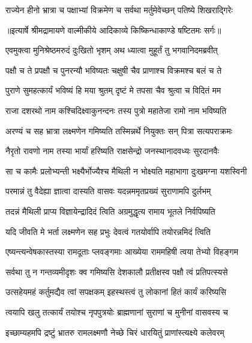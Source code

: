 \twolineshloka
{राज्येन हीनो भ्रात्रा च पक्षाभ्यां विक्रमेण च}
{सर्वथा मर्तुमेवेच्छन् पतिष्ये शिखराद्गिरेः} %


{॥इत्यार्षे श्रीमद्रामायणे वाल्मीकीये आदिकाव्ये किष्किन्धाकाण्डे षष्टितमः सर्गः॥}


\twolineshloka
{एवमुक्त्वा मुनिश्रेष्ठमरुदं दुःखितो भृशम्}
{अथ ध्यात्वा मुहूर्तं तु भगवानिदमब्रवीत्} %

\twolineshloka
{पक्षौ च ते प्रपक्षौ च पुनरन्यौ भविष्यतः}
{चक्षुषी चैव प्राणाश्च विक्रमश्च बलं च ते} %

\twolineshloka
{पुराणे सुमहत्कार्यं भविष्यं हि मया श्रुतम्}
{दृष्टं मे तपसा चैव श्रुत्वा च विदितं मम} %

\twolineshloka
{राजा दशरथो नाम कश्चिदिक्ष्वाकुनन्दनः}
{तस्य पुत्रो महातेजा रामो नाम भविष्यति} %

\twolineshloka
{अरण्यं च सह भ्रात्रा लक्ष्मणेन गमिष्यति}
{तस्मिन्नर्थे नियुक्तः सन् पित्रा सत्यपराक्रमः} %

\twolineshloka
{नैरृतो रावणो नाम तस्या भार्यां हरिष्यति}
{राक्षसेन्द्रो जनस्थानादवध्यः सुरदानवैः} %

\twolineshloka
{सा च कामैः प्रलोभ्यन्ती भक्ष्यैर्भोज्यैश्च मैथिली}
{न भोक्ष्यति महाभागा दुःखमग्ना यशस्विनी} %

\twolineshloka
{परमान्नं तु वैदेह्या ज्ञात्वा दास्यति वासवः}
{यदन्नममृतप्रख्यं सुराणामपि दुर्लभम्} %

\twolineshloka
{तदन्नं मैथिली प्राप्य विज्ञायेन्द्रादिदं त्विति}
{अग्रमुद्धृत्य रामाय भूतले निर्वपिष्यति} %

\twolineshloka
{यदि जीवति मे भर्ता लक्ष्मणेन सह प्रभुः}
{देवत्वं गतयोर्वापि तयोरन्नमिदं त्विति} %

\twolineshloka
{एष्यन्त्यन्वेषकास्तस्या रामदूताः प्लवङ्गमाः}
{आख्येया राममहिषी त्वया तेभ्यो विहङ्गम} %

\twolineshloka
{सर्वथा तु न गन्तव्यमीदृशः क्व गमिष्यसि}
{देशकालौ प्रतीक्षस्व पक्षौ त्वं प्रतिपत्स्यसे} %

\twolineshloka
{उत्सहेयमहं कर्तुमद्यैव त्वां सपक्षकम्}
{इहस्थस्त्वं तु लोकानां हितं कार्यं करिष्यसि} %

\twolineshloka
{त्वयापि खलु तत्कार्यं तयोश्च नृपपुत्रयोः}
{ब्राह्मणानां सुराणां च मुनीनां वासवस्य च} %

\twolineshloka
{इच्छाम्यहमपि द्रष्टुं भ्रातरु रामलक्ष्मणौ}
{नेच्छे चिरं धारयितुं प्राणांस्त्यक्ष्ये कलेवरम्} %


